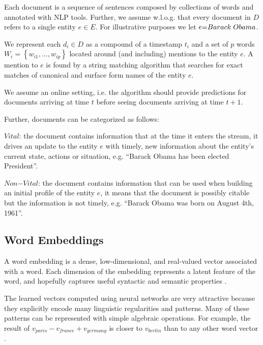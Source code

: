 \documentclass{article}
\begin{document}
Each document is a sequence of sentences composed by collections of words and annotated with NLP tools.
Further, we assume w.l.o.g. that every document in $D$ refers to a single entity $e \in E$. For illustrative purposes we let $e\mathord{=}Barack\hspace{1mm}Obama$.

We represent each $d_i \in D$ as a compound of a timestamp $t_i$ and a set of $p$ words $W_i = \left\{ {w_{i1}, ..., w_{ip}}\right\}$ located around (and including) mentions to the entity $e$. A mention to $e$ is found by a string matching algorithm that searches for exact matches of canonical and surface form names of the entity $e$.

We assume an online setting, i.e. the algorithm should provide predictions for documents arriving at time $t$ before seeing documents arriving at time $t+1$.

Further, documents can be categorized as follows:

\begin{itemize*}
    \item $Vital$: the document contains information that at the time it enters the stream, it drives an update to the entity $e$ with timely, new information about the entity's current state, actions or situation, e.g. ``Barack Obama has been elected President''.
    \item $Non\mathord{-}Vital$: the document contains information that can be used when building an initial profile of the entity $e$, it means that the document is possibly citable but the information is not timely, e.g. ``Barack Obama was born on August 4th, 1961''.
\end{itemize*}

\subsection{Word Embeddings}
\label{emb}

A word embedding is a dense, low-dimensional, and real-valued vector associated with a word. Each dimension of the embedding represents a latent feature of the word, and hopefully captures useful syntactic and semantic properties \cite{Turian10wordrepresentations}.

The learned vectors computed using neural networks are very attractive because they explicitly encode many linguistic regularities and patterns. Many of these patterns can be represented with simple algebraic operations. For example, the result of $v_{paris} - v_{france} + v_{germany}$ is closer to $v_{berlin}$ than to any other word vector \cite{mikolovChen,mikolovYih}.
\end{document}
